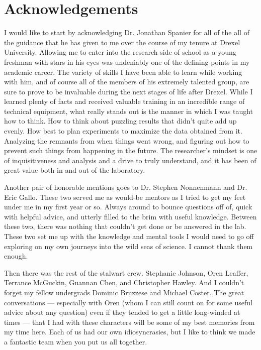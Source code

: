 \pagestyle{fancy}
\chapter*{Acknowledgements}
\thispagestyle{empty}


I would like to start by acknowledging Dr. Jonathan Spanier for all of the all of the guidance that he has given to me over the course of my tenure at Drexel University. Allowing me to enter into the research side of school as a young freshman with stars in his eyes was undeniably one of the defining points in my academic career. The variety of skills I have been able to learn while working with him, and of course all of the members of his extremely talented group, are sure to prove to be invaluable during the next stages of life after Drexel. While I learned plenty of facts and received valuable training in an incredible range of technical equipment, what really stands out is the manner in which I was taught how to think. How to think about puzzling results that didn't quite add up evenly. How best to plan experiments to maximize the data obtained from it. Analyzing the remnants from when things went wrong, and figuring out how to prevent such things from happening in the future. The researcher's mindset is one of inquisitiveness and analysis and a drive to truly understand, and it has been of great value both in and out of the laboratory. 

Another pair of honorable mentions goes to Dr. Stephen Nonnenmann and Dr. Eric Gallo. These two served me as would-be mentors as I tried to get my feet under me in my first year or so. Always around to bounce questions off of, quick with helpful advice, and utterly filled to the brim with useful knowledge. Between these two, there was nothing that couldn't get done or be answered in the lab. These two set me up with the knowledge and mental tools I would need to go off exploring on my own journeys into the wild seas of science. I cannot thank them enough. 

Then there was the rest of the stalwart crew. Stephanie Johnson, Oren Leaffer, Terrance McGuckin, Guannan Chen, and Christopher Hawley. And I couldn't forget my fellow undergrads Dominic Bruzzese and Michael Coster. The great conversations --- especially with Oren (whom I can still count on for some useful advice about any question) even if they tended to get a little long-winded at times --- that I had with these characters will be some of my best memories from my time here. Each of us had our own idiosyncrasies, but I like to think we made a fantastic team when you put us all together. 

